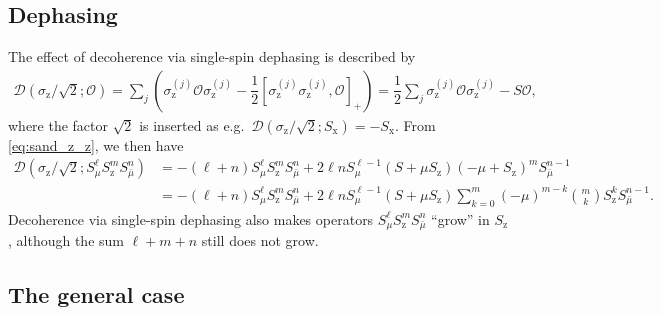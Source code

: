\documentclass[aps,notitlepage,nofootinbib,11pt]{revtex4-1}
\newcommand{\f}[2]{\dfrac{#1}{#2}} %
\newcommand{\p}[1]{\left(#1\right)} %
\renewcommand{\sp}[1]{\left[#1\right]} %
\newcommand{\D}{\mathcal{D}}
\renewcommand{\O}{\mathcal{O}}
\newcommand{\z}{\text{z}}
\newcommand{\x}{\text{x}}
\newcommand{\bmu}{{\bar\mu}}
\newcommand{\1}{\mathds{1}}
\begin{document}
\subsection{Dephasing}
\label{sec:dephasing_single}

The effect of decoherence via single-spin dephasing is described by
\begin{align}
  \D\p{\sigma_\z/\sqrt2; \O}
  = \sum_j\p{\sigma_\z^{(j)} \O \sigma_\z^{(j)}
    - \f12\sp{\sigma_\z^{(j)} \sigma_\z^{(j)},\O}_+}
  = \f12 \sum_j \sigma_\z^{(j)} \O \sigma_\z^{(j)} - S \O,
\end{align}
where the factor $\sqrt2$ is inserted as
e.g.~$\D\p{\sigma_\z/\sqrt2;S_\x}=-S_\x$.  From \eqref{eq:sand_z_z},
we then have
\begin{align}
  \D\p{\sigma_\z/\sqrt2; S_\mu^\ell S_\z^m S_\bmu^n}
  &= -\p{\ell+n} S_\mu^\ell S_\z^m S_\bmu^n
  + 2 \ell n S_\mu^{\ell-1} \p{S + \mu S_\z}
  \p{-\mu + S_\z}^m S_\bmu^{n-1} \\
  &= -\p{\ell+n} S_\mu^\ell S_\z^m S_\bmu^n
  + 2 \ell n S_\mu^{\ell-1} \p{S + \mu S_\z}
  \sum_{k=0}^m \p{-\mu}^{m-k} { m \choose k } S_\z^k S_\bmu^{n-1}.
\end{align}
Decoherence via single-spin dephasing also makes operators
$S_\mu^\ell S_\z^m S_\bmu^n$ ``grow'' in $S_\z$, although the sum
$\ell+m+n$ still does not grow.


\subsection{The general case}
\label{sec:general_single}
\end{document}
